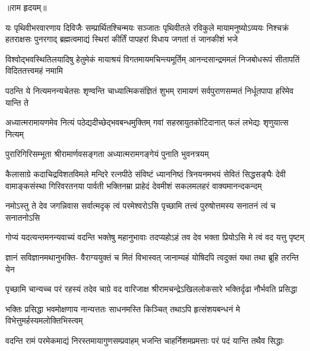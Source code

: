 


॥राम हृदयम्॥

\fourlineindentedshloka
{यः पृथिवीभरवारणाय दिविजैः सम्प्रार्थितश्चिन्मयः}
{सञ्जातः पृथिवीतले रविकुले मायामनुष्योऽव्ययः}
{निश्चक्रं हतराक्षसः पुनरगाद् ब्रह्मत्वमाद्यं स्थिरां}
{कीर्तिं पापहरां विधाय जगतां तं जानकीशं भजे} %

\fourlineindentedshloka
{विश्वोद्भवस्थितिलयादिषु हेतुमेकं}
{मायाश्रयं विगतमायमचिन्त्यमूर्तिम्}
{आनन्दसान्द्रममलं निजबोधरूपं}
{सीतापतिं विदिततत्त्वमहं नमामि} %

\fourlineindentedshloka
{पठन्ति ये नित्यमनन्यचेतसः}
{शृण्वन्ति चाध्यात्मिकसंज्ञितं शुभम्}
{रामायणं सर्वपुराणसम्मतं}
{निर्धूतपापा हरिमेव यान्ति ते} %

\fourlineindentedshloka
{अध्यात्मरामायणमेव नित्यं}
{पठेद्यदीच्छेद्भवबन्धमुक्तिम्}
{गवां सहस्रायुतकोटिदानात्}
{फलं लभेद्यः शृणुयात्स नित्यम्} %

\twolineshloka
{पुरारिगिरिसम्भूता श्रीरामार्णवसङ्गता}
{अध्यात्मरामगङ्गेयं पुनाति भुवनत्रयम्} %

\fourlineindentedshloka
{कैलासाग्रे कदाचिद्रविशतविमले मन्दिरे रत्नपीठे}
{संविष्टं ध्याननिष्ठं त्रिनयनमभयं सेवितं सिद्धसङ्घैः}
{देवी वामाङ्कसंस्था गिरिवरतनया पार्वती भक्तिनम्रा}
{प्राहेदं देवमीशं सकलमलहरं वाक्यमानन्दकन्दम्} %


\fourlineindentedshloka
{नमोऽस्तु ते देव जगन्निवास}
{सर्वात्मदृक् त्वं परमेश्वरोऽसि}
{पृच्छामि तत्त्वं पुरुषोत्तमस्य}
{सनातनं त्वं च सनातनोऽसि} %

\fourlineindentedshloka
{गोप्यं यदत्यन्तमनन्यवाच्यं}
{वदन्ति भक्तेषु महानुभावाः}
{तदप्यहोऽहं तव देव भक्ता}
{प्रियोऽसि मे त्वं वद यत्तु पृष्टम्} %

\fourlineindentedshloka
{ज्ञानं सविज्ञानमथानुभक्ति-}
{वैराग्ययुक्तं च मितं विभास्वत्}
{जानाम्यहं योषिदपि त्वदुक्तं}
{यथा तथा ब्रूहि तरन्ति येन} %

\fourlineindentedshloka
{पृच्छामि चान्यच्च परं रहस्यं}
{तदेव चाग्रे वद वारिजाक्ष}
{श्रीरामचन्द्रेऽखिललोकसारे}
{भक्तिर्दृढा नौर्भवति प्रसिद्धा} %

\fourlineindentedshloka
{भक्तिः प्रसिद्धा भवमोक्षणाय}
{नान्यत्ततः साधनमस्ति किञ्चित्}
{तथाऽपि हृत्संशयबन्धनं मे}
{विभेत्तुमर्हस्यमलोक्तिभिस्त्वम्} %

\fourlineindentedshloka
{वदन्ति रामं परमेकमाद्यं}
{निरस्तमायागुणसम्प्रवाहम्}
{भजन्ति चाहर्निशमप्रमत्ताः}
{परं पदं यान्ति तथैव सिद्धाः} %

